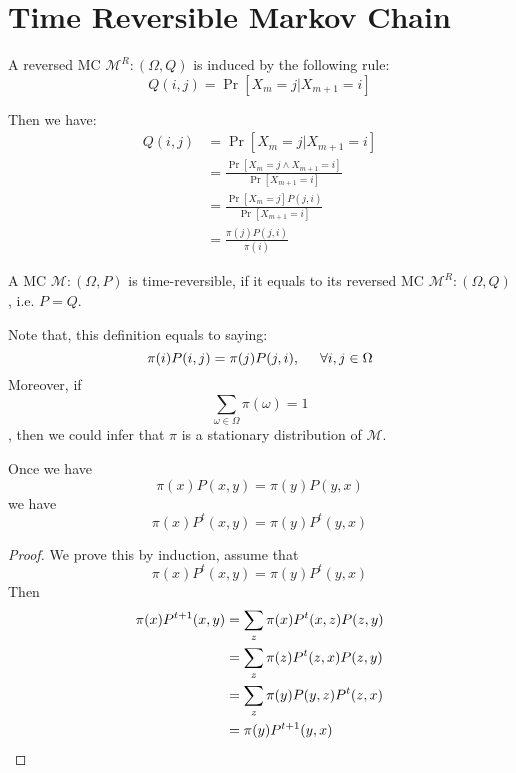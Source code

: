 \section{Time Reversible Markov Chain}
\begin{define}
  A reversed MC $\mathcal{M}^R: (\Omega, Q)$ is induced by the following rule:
  \[
    Q(i, j) = \Pr[X_m=j|X_{m+1}=i]
  \]
\end{define}
Then we have:
\begin{align*}
    Q(i, j) &= \Pr[X_m=j|X_{m+1}=i] \\
    &= \frac{\Pr[X_m=j\land X_{m+1}=i]}{\Pr[X_{m+1}=i]} \\
    &= \frac{\Pr[X_m = j] P(j, i)}{\Pr[X_{m+1} = i]} \\
    &= \frac{\pi(j)P(j,i)}{\pi(i)}
\end{align*}

\begin{define}
  A MC $\mathcal{M}: (\Omega, P)$ is time-reversible, if it equals to its reversed MC $\mathcal{M}^R: (\Omega, Q)$, i.e. $P = Q$.
\end{define}
Note that, this definition equals to saying:
\[
  \pi(i)P(i, j) = \pi(j)P(j,i),\hspace{0.5cm} \forall i, j\in\Omega
\] 
Moreover, if \[\sum_{\omega\in\Omega}\pi(\omega) = 1\], then we could infer that $\pi$ is a stationary distribution of $\mathcal{M}$.

\begin{lemma}
  Once we have
  \[\pi(x) P(x, y) = \pi(y) P(y, x)\]
  we have
  \[\pi(x) P^t(x, y) = \pi(y) P^t(y, x)\]
\end{lemma}
\begin{proof}
  We prove this by induction, assume that
  \[\pi(x) P^t(x, y) = \pi(y) P^t(y, x)\]
  Then
  \begin{align*}
    \pi(x) P^{t+1}(x, y) &= \sum_{z} \pi(x) P^t(x, z) P(z, y) \\
                         &= \sum_{z} \pi(z) P^t(z, x) P(z, y) \\
                         &= \sum_z \pi(y) P(y, z) P^t(z, x) \\
                         &= \pi(y) P^{t+1}(y, x) \qedhere
  \end{align*}
\end{proof}
